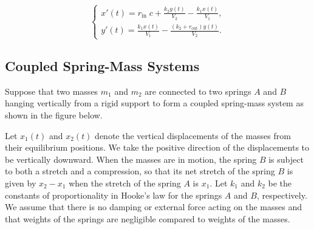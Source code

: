 \[\displaystyle\begin{cases}
	\displaystyle x'(t) = r_{\text{in}}\; c+\frac{k_2y(t)}{V_2} - \frac{k_1x(t)}{V_1 },\\[3ex]
	\displaystyle y'(t) = \frac{k_1x(t)}{V_1}-\frac{(k_2+r_{\text{out}})y(t)}{V_2}.
\end{cases}
\]

\subsection{Coupled Spring-Mass Systems} 
Suppose that two masses $m_1$ and $m_2$ are connected to two springs $A$ and $B$   hanging vertically from  a rigid support to form a coupled spring-mass system as shown in the figure below.  
% 
% 
% 		
% 		
% 		
% 		
% 		
% 		
% 		
% 		
% 		
% 		
% 		
% 		
 	
Let $x_1(t)$ and $x_2(t)$ denote the vertical displacements of the masses from their equilibrium positions.  We take  the positive direction of the displacements to be  vertically downward.
 When the masses are in motion, the spring $B$ is subject to both a stretch and a compression, so that its net stretch of the spring $B$ is given by 
 $x_2-x_1$ when the stretch of the spring $A$ is $x_1$. Let $k_1$ and $k_2$ be the constants of proportionality in Hooke's law for the springs $A$ and $B$, respectively. We assume that there is no damping or external force acting on the masses and that weights of the springs are negligible compared to  weights of the masses.
 

